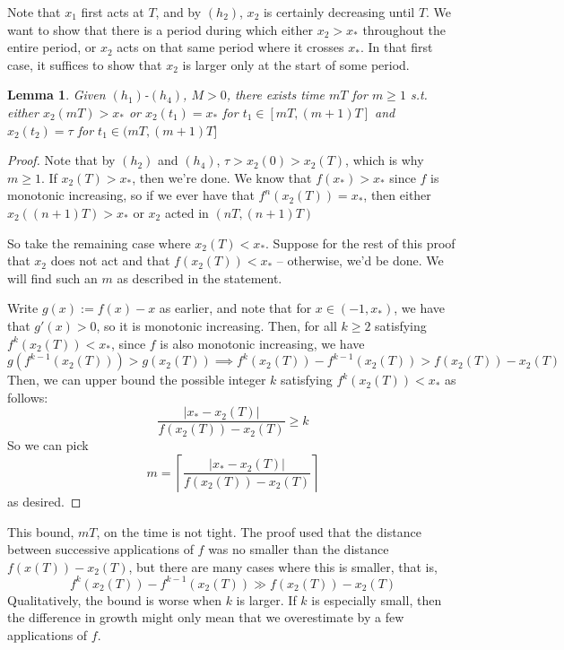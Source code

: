 \documentclass[preprint,12pt]{elsarticle}
\newcommand{\lt}{\left}
\newcommand{\rt}{\right}
\newtheorem{lemma}{Lemma}
\begin{document}
Note that $x_1$ first acts at $T$, and by $(h_2)$, $x_2$ is certainly decreasing until $T$. We want to show that there is a period during which either $x_2 > x_*$ throughout the entire period, or $x_2$ acts on that same period where it crosses $x_*$. In that first case, it suffices to show that $x_2$ is larger only at the start of some period. 
\begin{lemma}
   Given $(h_1)$-$(h_4)$, $M>0$, there exists time $mT$ for $m \geq 1$ s.t. either $x_2(mT) > x_*$ or $x_2(t_1) = x_*$ for $t_1 \in [mT, (m+1)T]$ and $x_2(t_2) = \tau$ for $t_1 \in (mT, (m+1)T]$
\end{lemma}

\begin{proof} Note that by $(h_2)$ and $(h_4)$, $\tau > x_2(0) > x_2(T)$, which is why $m \geq 1$. If $x_2(T) > x_*$, then we're done. We know that $f(x_*) > x_*$ since $f$ is monotonic increasing, so if we ever have that $f^n(x_2(T)) = x_*$, then either $x_2((n+1)T) > x_*$ or $x_2$ acted in $(nT, (n+1)T)$

So take the remaining case where $x_2(T) < x_*$. Suppose for the rest of this proof that $x_2$ does not act and that $f(x_2(T)) < x_*$ -- otherwise, we'd be done. We will find such an $m$ as described in the statement.

Write $g(x) := f(x) - x$ as earlier, and note that for $x \in (-1,x_*)$, we have that $g'(x) > 0$, so it is monotonic increasing. Then, for all $k \geq 2$ satisfying $f^k(x_2(T)) < x_*$, since $f$ is also monotonic increasing, we have
     \[ g(f^{k-1}(x_2(T))) > g(x_2(T)) \implies f^k(x_2(T)) - f^{k-1}(x_2(T)) > f(x_2(T)) - x_2(T) \]
Then, we can upper bound the possible integer $k$ satisfying $f^k(x_2(T)) < x_*$ as follows: \[
\frac{|x_* - x_2(T)| }{f(x_2(T)) - x_2(T)} \geq k  
\]
So we can pick \[
m = \lt \lceil \frac{|x_* - x_2(T)| }{f(x_2(T)) - x_2(T)}\rt \rceil
\]
as desired.



\end{proof}
This bound, $mT$, on the time is not tight. The proof used that the distance between successive applications of $f$ was no smaller than the distance $f(x(T)) - x_2(T)$, but there are many cases where this is smaller, that is, \[
f^k(x_2(T)) - f^{k-1}(x_2(T)) \gg f(x_2(T)) - x_2(T)
\]
Qualitatively, the bound is worse when $k$ is larger. If $k$ is especially small, then the difference in growth might only mean that we overestimate by a few applications of $f$. 
\end{document}
